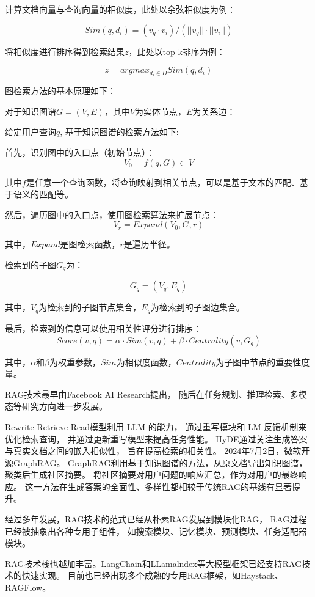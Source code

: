 \documentclass{xmu}
\begin{document}
计算文档向量与查询向量的相似度，此处以余弦相似度为例：

$$
Sim(q,d_i) = (v_q·v_i)/(||v_q||·||v_i||)
$$

将相似度进行排序得到检索结果$z$，此处以top-k排序为例：

$$
z = argmax_{d_i \in D} Sim(q,d_i)
$$

图检索方法的基本原理如下：

对于知识图谱$G=(V,E)$，其中$V$为实体节点，$E$为关系边：

给定用户查询$q$, 基于知识图谱的检索方法如下:

首先，识别图中的入口点（初始节点）：
$$
V_0 = f(q, G) \subset V
$$

其中$f$是任意一个查询函数，将查询映射到相关节点，可以是基于文本的匹配、基于语义的匹配等。

然后，遍历图中的入口点，使用图检索算法来扩展节点：
$$
V_r = Expand(V_0, G, r)
$$

其中，$Expand$是图检索函数，$r$是遍历半径。

检索到的子图$G_q$为：

$$
G_q = (V_q, E_q)
$$

其中，$V_q$为检索到的子图节点集合，$E_q$为检索到的子图边集合。

最后，检索到的信息可以使用相关性评分进行排序：
$$
Score(v, q) = \alpha \cdot Sim(v, q) + \beta \cdot Centrality(v, G_q)
$$

其中，$\alpha$和$\beta$为权重参数，$Sim$为相似度函数，$Centrality$为子图中节点的重要性度量。

RAG技术最早由Facebook AI Research提出，
随后在任务规划、推理检索、多模态等研究方向进一步发展。

Rewrite-Retrieve-Read模型利用 LLM 的能力，
通过重写模块和 LM 反馈机制来优化检索查询，
并通过更新重写模型来提高任务性能\cite{RRR}。
HyDE通过关注生成答案与真实文档之间的嵌入相似性，
旨在提高检索的相关性\cite{HyDE}。
2024年7月2日，微软开源GraphRAG\cite{graphRAG}。
GraphRAG利用基于知识图谱的方法，从原文档导出知识图谱，聚类后生成社区摘要。
将社区摘要对用户问题的响应汇总，作为对用户的最终响应。
这一方法在生成答案的全面性、多样性都相较于传统RAG的基线有显著提升。

经过多年发展，RAG技术的范式已经从朴素RAG发展到模块化RAG，
RAG过程已经被抽象出各种专用子组件，
如搜索模块、记忆模块、预测模块、任务适配器模块。\cite{RAG}

RAG技术栈也越加丰富。LangChain和LLamalndex等大模型框架已经支持RAG技术的快速实现。
目前也已经出现多个成熟的专用RAG框架，如Haystack、RAGFlow。
\end{document}
